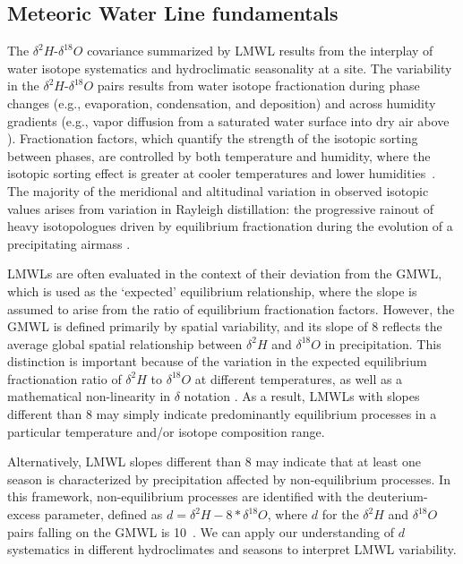 \documentclass[draft, linenumbers]{agujournal2018}
\begin{document}
\subsection{Meteoric Water Line fundamentals}
The $\delta^{2}H$-$\delta^{18}O$ covariance summarized by LMWL results from the interplay of water isotope systematics and hydroclimatic seasonality at a site.  The variability in the $\delta^{2}H$-$\delta^{18}O$ pairs results from water isotope fractionation during phase changes (e.g., evaporation, condensation, and deposition) and across humidity gradients (e.g., vapor diffusion from a saturated water surface into dry air above \citep{CraigGordon1965}). Fractionation factors, which quantify the strength of the isotopic sorting between phases, are controlled by both temperature and humidity, where the isotopic sorting effect is greater at cooler temperatures and lower humidities~\citep{Majoube1971, Cappa2003}. The majority of the meridional and altitudinal variation in observed isotopic values arises from variation in Rayleigh distillation: the progressive rainout of heavy isotopologues driven by equilibrium fractionation during the evolution of a precipitating airmass \citep{Gat1996}. 

LMWLs are often evaluated in the context of their deviation from the GMWL, which is used as the `expected' equilibrium relationship, where the slope is assumed to arise from the ratio of equilibrium fractionation factors. However, the GMWL is defined primarily by spatial variability, and its slope of 8 reflects the average global spatial relationship between $\delta^{2}H$ and $\delta^{18}O$ in precipitation. This distinction is important because of the variation in the expected equilibrium fractionation ratio of $\delta^{2}H$ to $\delta^{18}O$ at different temperatures, as well as a mathematical non-linearity in $\delta$ notation \citep{Dutsch2017}. As a result, LMWLs with slopes different than 8 may simply indicate predominantly equilibrium processes in a particular temperature and/or isotope composition range. 

Alternatively, LMWL slopes different than 8 may indicate that at least one season is characterized by precipitation affected by non-equilibrium processes. In this framework, non-equilibrium processes are identified with the deuterium-excess parameter, defined as $d = \delta^{2}H - 8* \delta^{18}O$, where $d$ for the $\delta^{2}H$ and $\delta^{18}O$ pairs falling on the GMWL is 10~\citep{Dansgaard1964}. We can apply our understanding of $d$ systematics in different hydroclimates and seasons to interpret LMWL variability. 
\end{document}

